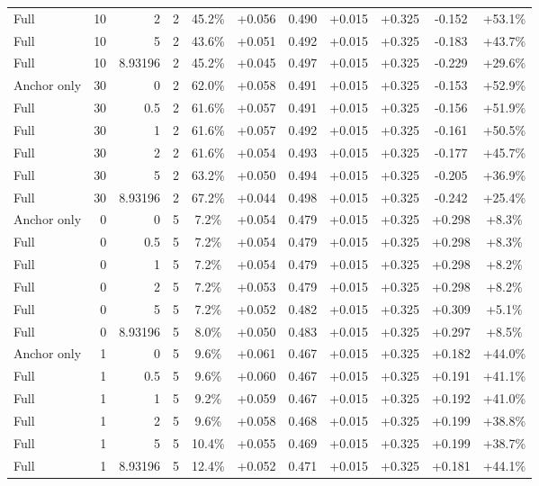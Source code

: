 \begin{table}[htbp]
\begin{tabular}{lrrrccccccc}
Full & 10 & 2 & 2 & 45.2\% & +0.056 & 0.490 & +0.015 & +0.325 & -0.152 & +53.1\% \\
Full & 10 & 5 & 2 & 43.6\% & +0.051 & 0.492 & +0.015 & +0.325 & -0.183 & +43.7\% \\
Full & 10 & 8.93196 & 2 & 45.2\% & +0.045 & 0.497 & +0.015 & +0.325 & -0.229 & +29.6\% \\
Anchor only & 30 & 0 & 2 & 62.0\% & +0.058 & 0.491 & +0.015 & +0.325 & -0.153 & +52.9\% \\
Full & 30 & 0.5 & 2 & 61.6\% & +0.057 & 0.491 & +0.015 & +0.325 & -0.156 & +51.9\% \\
Full & 30 & 1 & 2 & 61.6\% & +0.057 & 0.492 & +0.015 & +0.325 & -0.161 & +50.5\% \\
Full & 30 & 2 & 2 & 61.6\% & +0.054 & 0.493 & +0.015 & +0.325 & -0.177 & +45.7\% \\
Full & 30 & 5 & 2 & 63.2\% & +0.050 & 0.494 & +0.015 & +0.325 & -0.205 & +36.9\% \\
Full & 30 & 8.93196 & 2 & 67.2\% & +0.044 & 0.498 & +0.015 & +0.325 & -0.242 & +25.4\% \\
Anchor only & 0 & 0 & 5 & 7.2\% & +0.054 & 0.479 & +0.015 & +0.325 & +0.298 & +8.3\% \\
Full & 0 & 0.5 & 5 & 7.2\% & +0.054 & 0.479 & +0.015 & +0.325 & +0.298 & +8.3\% \\
Full & 0 & 1 & 5 & 7.2\% & +0.054 & 0.479 & +0.015 & +0.325 & +0.298 & +8.2\% \\
Full & 0 & 2 & 5 & 7.2\% & +0.053 & 0.479 & +0.015 & +0.325 & +0.298 & +8.2\% \\
Full & 0 & 5 & 5 & 7.2\% & +0.052 & 0.482 & +0.015 & +0.325 & +0.309 & +5.1\% \\
Full & 0 & 8.93196 & 5 & 8.0\% & +0.050 & 0.483 & +0.015 & +0.325 & +0.297 & +8.5\% \\
Anchor only & 1 & 0 & 5 & 9.6\% & +0.061 & 0.467 & +0.015 & +0.325 & +0.182 & +44.0\% \\
Full & 1 & 0.5 & 5 & 9.6\% & +0.060 & 0.467 & +0.015 & +0.325 & +0.191 & +41.1\% \\
Full & 1 & 1 & 5 & 9.2\% & +0.059 & 0.467 & +0.015 & +0.325 & +0.192 & +41.0\% \\
Full & 1 & 2 & 5 & 9.6\% & +0.058 & 0.468 & +0.015 & +0.325 & +0.199 & +38.8\% \\
Full & 1 & 5 & 5 & 10.4\% & +0.055 & 0.469 & +0.015 & +0.325 & +0.199 & +38.7\% \\
Full & 1 & 8.93196 & 5 & 12.4\% & +0.052 & 0.471 & +0.015 & +0.325 & +0.181 & +44.1\% \\

\end{tabular}
\end{table}
